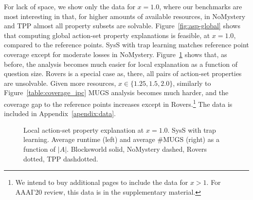 For lack of space, we show only the data for $x = 1.0$, where our
benchmarks are most interesting in that, for higher amounts of
available resources, in NoMystery and TPP almost all property subsets
are solvable.
%
Figure~\ref{fig:asp-global} shows that computing global action-set
property explanations is feasible, at $x=1.0$, compared to the
reference points. SysS with trap learning matches reference point
coverage except for moderate losses in NoMystery.
%
Figure~\ref{fig:asp-local} shows that, as before, the analysis becomes
much easier for local explanation as a function of question size.
%
Rovers is a special case as, there, all pairs of action-set properties
are unsolvable.
%
Given more resources, $x \in \{1.25, 1.5, 2.0\}$, 
%
%
%
similarly to Figure~\ref{table:coverage_ipc} MUGS analysis becomes
much harder, and the coverage gap to the reference points increases
except in Rovers.\ifdefined\suppflagdefined\else\footnote{We intend to
buy additional pages to include the data for $x > 1$. For AAAI'20
review, this data is in the supplementary material.}
%
%
\ifdefined\suppflagdefined
%
The data is included in Appendix~\ref{apendix:data}.
%
\fi


\begin{figure}[t]
\vspace{-0.0cm}
\small
\centering


\vspace{-0.3cm}
\caption{\label{fig:asp-local} Local action-set property explanation 
at $x=1.0$. SysS with trap learning. Average runtime (left) and
average \#MUGS (right) as a function of $|A|$. Blocksworld solid,
NoMystery dashed, Rovers dotted, TPP dashdotted.
}
\vspace{-0.6cm}
\end{figure}










